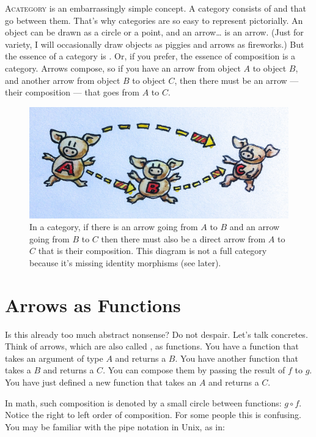 \lettrine[lhang=0.17]{A}{category} is an embarrassingly simple concept.
A category consists of  and  that go between them. That's
why categories are so easy to represent pictorially. An object can be
drawn as a circle or a point, and an arrow\ldots{} is an arrow. (Just
for variety, I will occasionally draw objects as piggies and arrows as
fireworks.) But the essence of a category is . Or, if you
prefer, the essence of composition is a category. Arrows compose, so
if you have an arrow from object $A$ to object $B$, and another arrow from
object $B$ to object $C$, then there must be an arrow --- their composition
--- that goes from $A$ to $C$.

\begin{figure}
\centering
\includegraphics[width=\textwidth]{images/img_1330.jpg}
\caption{In a category, if there is an arrow going from $A$ to $B$ and an arrow going from $B$ to $C$
then there must also be a direct arrow from $A$ to $C$ that is their composition. This diagram is not a full
category because it’s missing identity morphisms (see later).}
\end{figure}

\section{Arrows as Functions}\label{arrows-as-functions}

Is this already too much abstract nonsense? Do not despair. Let's talk
concretes. Think of arrows, which are also called , as
functions. You have a function  that takes an argument of type $A$ and
returns a $B$. You have another function  that takes a $B$ and returns a $C$.
You can compose them by passing the result of $f$ to $g$. You have just
defined a new function that takes an $A$ and returns a $C$.

In math, such composition is denoted by a small circle between
functions: \ensuremath{g \circ f}. Notice the right to left order of composition. For some
people this is confusing. You may be familiar with the pipe notation in
Unix, as in:

